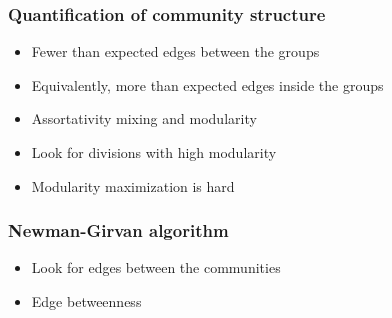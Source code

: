 \documentclass{beamer}
\begin{document}
\begin{frame}
    \frametitle{Quantification of community structure}
    \centering

    \begin{itemize}
        \setlength\itemsep{1em}
        \item{Fewer than expected edges between the groups}
            \pause
        \item{Equivalently, more than expected edges inside the groups}
            \pause
        \item{Assortativity mixing and modularity}
            \pause
        \item{Look for divisions with high modularity}
            \pause
        \item{Modularity maximization is hard}
    \end{itemize}

\end{frame}
\begin{frame}
    \frametitle{Newman-Girvan algorithm}
    \centering
    
    \begin{itemize}
        \setlength\itemsep{1em}
        \item{Look for edges between the communities}

        \item{Edge betweenness}
    \end{itemize}
\end{frame}
\end{document}
